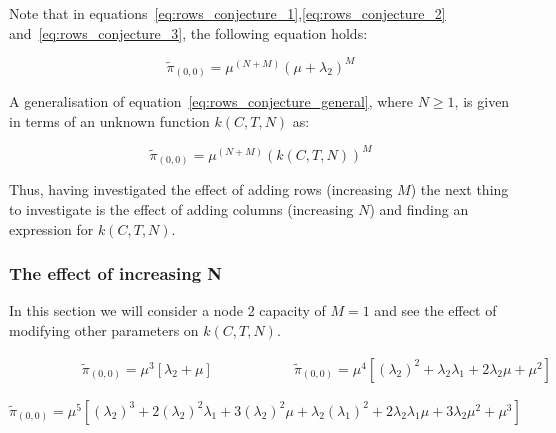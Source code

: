 Note that in equations~\eqref{eq:rows_conjecture_1},\eqref{eq:rows_conjecture_2}
and~\eqref{eq:rows_conjecture_3}, the following equation holds:

\begin{equation}\label{eq:rows_conjecture_general}
    \tilde{\pi}_{(0,0)} = \mu^{(N+M)} (\mu + \lambda_2)^M
\end{equation}

A generalisation of equation~\eqref{eq:rows_conjecture_general}, where \(N \geq
1\), is given in terms of an unknown function \(k(C,T,N)\) as:

\begin{equation}
    \tilde{\pi}_{(0,0)} = \mu^{(N+M)} (k(C,T,N))^M
\end{equation}

Thus, having investigated the effect of adding rows (increasing \(M\)) the
next thing to investigate is the effect of adding columns (increasing \(N\))
and finding an expression for \(k(C,T,N)\).

\subsubsection{The effect of increasing N}
In this section we will consider a node 2 capacity of \(M=1\) and see the
effect
of modifying other parameters on \(k(C, T, N)\).

\begin{multicols}{2}
    \begin{figure}[H]
        \centering
        \scalebox{0.8}{
            }
    \end{figure}
    \columnbreak
    \begin{figure}[H]
        \centering
        \scalebox{0.7}{
            }
    \end{figure}
\end{multicols}
\vspace{-0.5cm}
\begin{alignat}{2} \label{eq:00_rate_1131}
    \hspace{4em} & \tilde{\pi}_{(0,0)} = \mu^3[\lambda_2 + \mu] \hspace{5em} &
    \tilde{\pi}_{(0,0)} = \mu^4[(\lambda_2)^2 + \lambda_2 \lambda_1 + 2\lambda_2
    \mu + \mu^2]
\end{alignat}


\begin{figure}[H]
    \centering
    \scalebox{0.8}{
        }
\end{figure}
\begin{equation}\label{eq:00_rate_1141}
    \tilde{\pi}_{(0,0)} = \mu^5[(\lambda_2)^3 + 2(\lambda_2)^2 \lambda_1 +
    3(\lambda_2)^2 \mu + \lambda_2 (\lambda_1)^2 + 2\lambda_2 \lambda_1 \mu +
    3\lambda_2 \mu^2 + \mu^3]
\end{equation}

